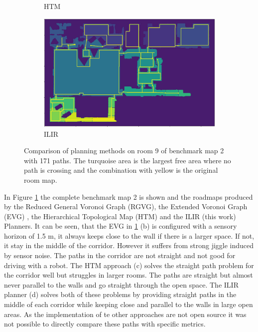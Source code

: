 \begin{figure}[h]
\begin{subfigure}{.5\textwidth}
      \caption{HTM}
    \end{subfigure}%
    \begin{subfigure}{.5\textwidth}
      \centering
      \includegraphics[width=\textwidth]{figures/60_results/hou2_roadmap_ilir.png}
      \caption{ILIR}
    \end{subfigure}
    \caption[Comparison of planning methods on room 9 of benchmark map 2 with 171 paths]{Comparison of planning methods on room 9 of benchmark map 2 with 171 paths. The turquoise area is the largest free area where no path is crossing and the combination with yellow is the original room map.}
    \label{fig:hou_comparison}
\end{figure}

In Figure \ref{fig:hou_comparison} the complete benchmark map 2 is shown and the roadmaps produced by the Reduced General Voronoi Graph (RGVG), the  Extended Voronoi Graph (EVG) \cite{beeson_towards_2005}, the Hierarchical Topological Map (HTM) \cite{hou_straight_2021} and the ILIR (this work) Planners. It can be seen, that the EVG in \ref{fig:hou_comparison} (b) is configured with a sensory horizon of 1.5 m, it always keeps close to the wall if there is a larger space. If not, it stay in the middle of the corridor. However it suffers from strong jiggle induced by sensor noise. The paths in the corridor are not straight and not good for driving with a robot. The HTM approach (c) solves the straight path problem for the corridor well but struggles in larger rooms. The paths are straight but almost never parallel to the walls and go straight through the open space. The ILIR planner (d) solves both of these problems by providing straight paths in the middle of each corridor while keeping close and parallel to the walls in large open areas. As the implementation of te other approaches are not open source it was not possible to directly compare these paths with specific metrics.

